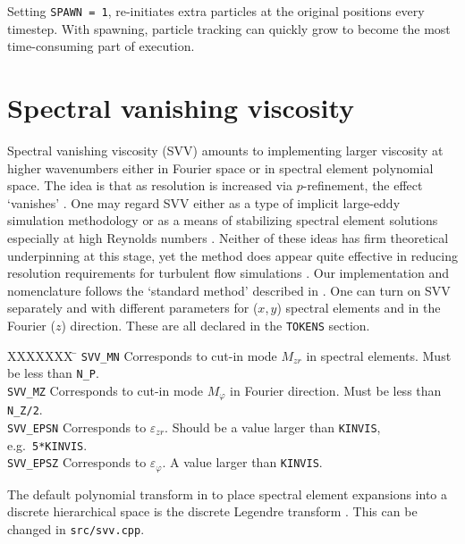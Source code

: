 \documentclass[11pt]{report}
\newcommand{\eg}{e.g.\ } \newcommand{\CC}{\mathrm{c.c.}}
\begin{document}
Setting \verb+SPAWN = 1+, re-initiates extra particles at the original
positions every timestep.  With spawning, particle tracking can
quickly grow to become the most time-consuming part of execution.

\section{Spectral vanishing viscosity}
\label{sec.svv}

Spectral vanishing viscosity (SVV) amounts to implementing larger
viscosity at higher wavenumbers either in Fourier space or in spectral
element polynomial space.  The idea is that as resolution is increased
via $p$-refinement, the effect `vanishes' \citep{tadmor89,mot93}.  One
may regard SVV either as a type of implicit large-eddy simulation
methodology \citep{pasquetti06} or as a means of stabilizing spectral
element solutions especially at high Reynolds numbers
\citep{xupa04,kish06}. Neither of these ideas has firm theoretical
underpinning at this stage, yet the method does appear quite effective
in reducing resolution requirements for turbulent flow simulations
\citep{ksb12,cnbmo15}.  Our implementation and nomenclature follows
the `standard method' described in \citet{ksb12}.  One can turn on SVV
separately and with different parameters for ($x$,\,$y$) spectral
elements and in the Fourier ($z$) direction.  These are all declared
in the \verb+TOKENS+ section.

\begin{tabbing}
XXXXXXX \= \kill
\texttt{SVV\_MN} \> Corresponds to cut-in mode $M_{zr}$ in 
spectral elements. Must be less than \texttt{N\_P}.\\ 
%
\texttt{SVV\_MZ} \> Corresponds to cut-in mode $M_\varphi$ in 
Fourier direction. Must be less than \texttt{N\_Z/2}.\\
%
\texttt{SVV\_EPSN} \> Corresponds to $\varepsilon_{zr}$. 
Should be a value larger than \texttt{KINVIS}, \eg \texttt{5*KINVIS}.\\
%
\texttt{SVV\_EPSZ} \> Corresponds to $\varepsilon_\varphi$. 
A value larger than \texttt{KINVIS}.
\end{tabbing}

The default polynomial transform in to place spectral element
expansions into a discrete hierarchical space is the discrete Legendre
transform \citep[see e.g.][]{blsc03}. This can be changed in
\verb|src/svv.cpp|.
\end{document}
